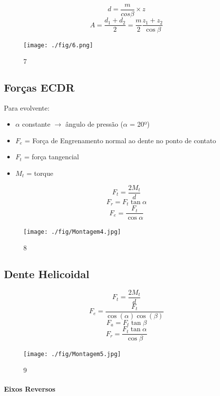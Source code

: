 \documentclass[a4paper, 12pt]{article}
\begin{document}
\[d = \frac{m}{cos \beta} \times z\]
\[A = \frac{d_{1}+d_{2}}{2}=\frac{m}{2}\frac{z_{1}+z_{2}}{\cos \beta}\]

\begin{figure}[h]
\begin{center}
\texttt{[image: ./fig/6.png]}
\caption{\label{fig:7}7} 
\end{center}
\end{figure}

\newpage

\subsection{Forças ECDR}

Para evolvente:
\begin{itemize}
\item $\alpha$ constante $\rightarrow$ ângulo de pressão ($\alpha$ = 20º)
\item $F_{e}$ = Força de Engrenamento normal ao dente no ponto de contato
\item $F_{t}$ = força tangencial
\item $M_{t}$ = torque
\end{itemize}

\[F_{t}=\frac{2M_{t}}{d}\]
\[F_{r}=F_{t} \tan \alpha\]
\[F_{e}= \frac{F_{t}}{\cos \alpha}\]

\begin{figure}[h]
\begin{center}
\texttt{[image: ./fig/Montagem4.jpg]}
\caption{\label{fig:8}8} 
\end{center}
\end{figure}

\pagebreak

\subsection{Dente Helicoidal}

\[F_{t} = \frac{2M_{t}}{d}\]
\[F_{e} = \frac{F_{t}}{\cos (\alpha) \cos (\beta)}\]
\[F_{a}=F_{t} \tan \beta\]
\[F_{r}= \frac{F_{t} \tan \alpha}{\cos \beta}\]

\begin{figure}[h]
\begin{center}
\texttt{[image: ./fig/Montagem5.jpg]}
\caption{\label{fig:9}9} 
\end{center}
\end{figure}

\paragraph{Eixos Reversos}
\end{document}
